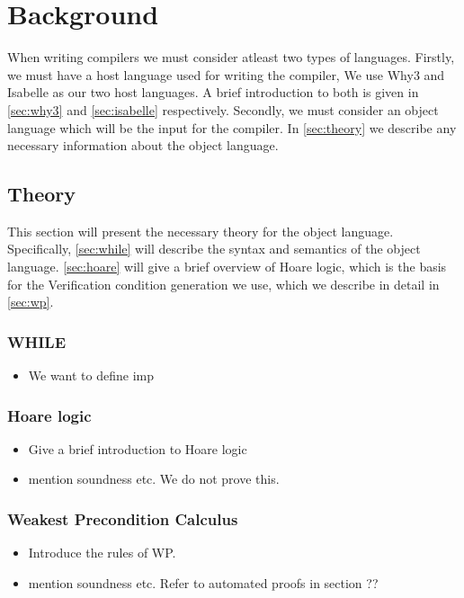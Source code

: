 \section{Background}
When writing compilers we must consider atleast two types of languages.
Firstly, we must have a host language used for writing the compiler,
We use Why3 and Isabelle as our two host languages. A brief introduction to both is given in \autoref{sec:why3} and \autoref{sec:isabelle} respectively.
Secondly, we must consider an object language which will be the input for the compiler.
In \autoref{sec:theory} we describe any necessary information about the object language.

\subsection{Theory}\label{sec:theory}
This section will present the necessary theory for the object language.
Specifically, \autoref{sec:while} will describe the syntax and semantics of the object language.
\autoref{sec:hoare} will give a brief overview of Hoare logic,
which is the basis for the Verification condition generation we use, which we describe in detail in
\autoref{sec:wp}.

\subsubsection{WHILE}\label{sec:while}

\begin{itemize}
\item We want to define imp
\end{itemize}

\subsubsection{Hoare logic}\label{sec:hoare}
\begin{itemize}
  \item Give a brief introduction to Hoare logic
\item mention soundness etc. We do not prove this.
\end{itemize}

\subsubsection{Weakest Precondition Calculus}\label{sec:wp}
\begin{itemize}
\item Introduce the rules of WP.
\item mention soundness etc. Refer to automated proofs in section ??
\end{itemize}

